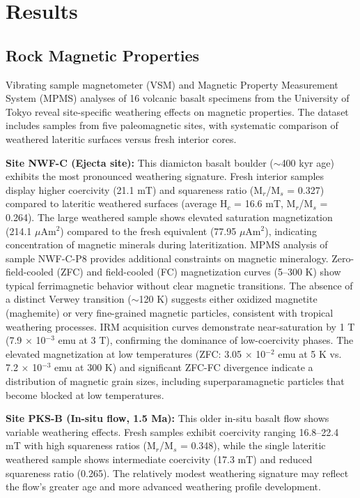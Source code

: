 \documentclass[twocolumn,11pt]{article}
\begin{document}
\section{Results}

\subsection{Rock Magnetic Properties}

Vibrating sample magnetometer (VSM) and Magnetic Property Measurement System (MPMS) analyses of 16 volcanic basalt specimens from the University of Tokyo reveal site-specific weathering effects on magnetic properties. The dataset includes samples from five paleomagnetic sites, with systematic comparison of weathered lateritic surfaces versus fresh interior cores.

\textbf{Site NWF-C (Ejecta site):} This diamicton basalt boulder ($\sim$400 kyr age) exhibits the most pronounced weathering signature. Fresh interior samples display higher coercivity (21.1 mT) and squareness ratio (M$_r$/M$_s$ = 0.327) compared to lateritic weathered surfaces (average H$_c$ = 16.6 mT, M$_r$/M$_s$ = 0.264). The large weathered sample shows elevated saturation magnetization (214.1 $\mu$Am$^2$) compared to the fresh equivalent (77.95 $\mu$Am$^2$), indicating concentration of magnetic minerals during lateritization. MPMS analysis of sample NWF-C-P8 provides additional constraints on magnetic mineralogy. Zero-field-cooled (ZFC) and field-cooled (FC) magnetization curves (5--300 K) show typical ferrimagnetic behavior without clear magnetic transitions. The absence of a distinct Verwey transition ($\sim$120 K) suggests either oxidized magnetite (maghemite) or very fine-grained magnetic particles, consistent with tropical weathering processes. IRM acquisition curves demonstrate near-saturation by 1 T (7.9 $\times$ 10$^{-3}$ emu at 3 T), confirming the dominance of low-coercivity phases. The elevated magnetization at low temperatures (ZFC: 3.05 $\times$ 10$^{-2}$ emu at 5 K vs. 7.2 $\times$ 10$^{-3}$ emu at 300 K) and significant ZFC-FC divergence indicate a distribution of magnetic grain sizes, including superparamagnetic particles that become blocked at low temperatures.

\textbf{Site PKS-B (In-situ flow, 1.5 Ma):} This older in-situ basalt flow shows variable weathering effects. Fresh samples exhibit coercivity ranging 16.8--22.4 mT with high squareness ratios (M$_r$/M$_s$ = 0.348), while the single lateritic weathered sample shows intermediate coercivity (17.3 mT) and reduced squareness ratio (0.265). The relatively modest weathering signature may reflect the flow's greater age and more advanced weathering profile development.
\end{document}
